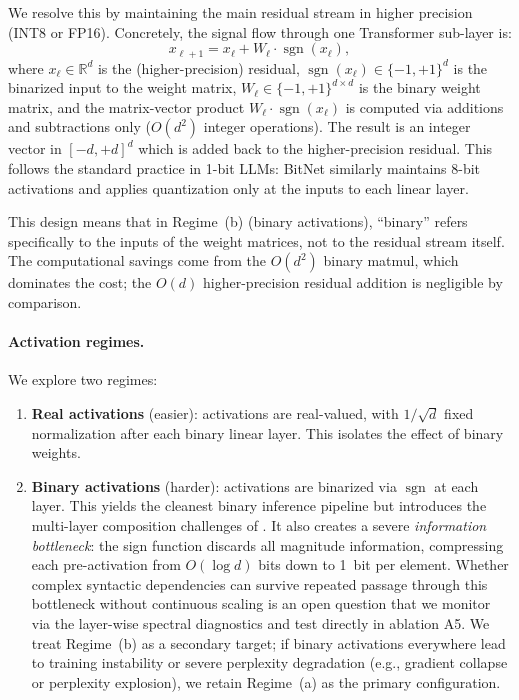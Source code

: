 \documentclass[12pt,a4paper]{article}
\theoremstyle{plain}
\theoremstyle{definition}
\theoremstyle{remark}
\newcommand{\R}{\mathbb{R}}
\newcommand{\pmone}{\{-1,+1\}}
\newcommand{\sgn}{\operatorname{sgn}}
\begin{document}
We resolve this by maintaining the main residual stream in higher precision (INT8 or FP16). Concretely, the signal flow through one Transformer sub-layer is:
\[
    x_{\ell+1} = x_\ell + W_\ell \cdot \sgn(x_\ell),
\]
where $x_\ell \in \R^d$ is the (higher-precision) residual, $\sgn(x_\ell) \in \pmone^d$ is the binarized input to the weight matrix, $W_\ell \in \pmone^{d \times d}$ is the binary weight matrix, and the matrix-vector product $W_\ell \cdot \sgn(x_\ell)$ is computed via additions and subtractions only ($O(d^2)$ integer operations). The result is an integer vector in $[-d, +d]^d$ which is added back to the higher-precision residual. This follows the standard practice in 1-bit LLMs: BitNet \citep{wang2023bitnet} similarly maintains 8-bit activations and applies quantization only at the inputs to each linear layer.

This design means that in Regime~(b) (binary activations), ``binary'' refers specifically to the inputs of the weight matrices, not to the residual stream itself. The computational savings come from the $O(d^2)$ binary matmul, which dominates the cost; the $O(d)$ higher-precision residual addition is negligible by comparison.

\paragraph{Activation regimes.}
We explore two regimes:
\begin{enumerate}[label=(\alph*)]
    \item \textbf{Real activations} (easier): activations are real-valued, with $1/\sqrt{d}$ fixed normalization after each binary linear layer. This isolates the effect of binary weights.
    \item \textbf{Binary activations} (harder): activations are binarized via $\sgn$ at each layer. This yields the cleanest binary inference pipeline but introduces the multi-layer composition challenges of . It also creates a severe \emph{information bottleneck}: the sign function discards all magnitude information, compressing each pre-activation from $O(\log d)$ bits down to 1~bit per element. Whether complex syntactic dependencies can survive repeated passage through this bottleneck without continuous scaling is an open question that we monitor via the layer-wise spectral diagnostics and test directly in ablation A5. We treat Regime~(b) as a secondary target; if binary activations everywhere lead to training instability or severe perplexity degradation (e.g., gradient collapse or perplexity explosion), we retain Regime~(a) as the primary configuration.
\end{enumerate}
\end{document}
